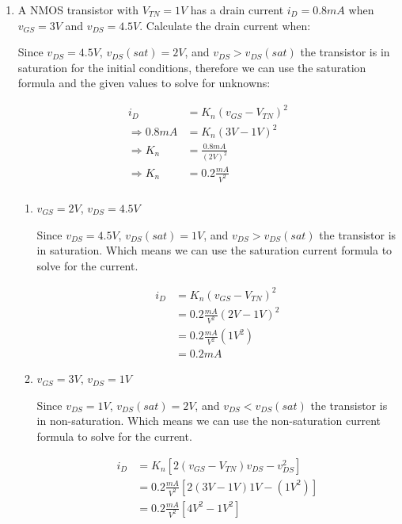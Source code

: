 \documentclass{article}
\begin{document}
\begin{enumerate}
    \item A NMOS transistor with $V_{TN} = 1V$ has a drain current $i_D = 0.8mA$ when $v_{GS} = 3V$ and $v_{DS} = 4.5V$. Calculate the drain current when:
    \begin{center}
        Since $v_{DS} = 4.5V$, $v_{DS}(sat) = 2V$, and $v_{DS} > v_{DS}(sat)$ the transistor is in saturation for the initial conditions, therefore we can use the saturation formula and the given values to solve for unknowns:
    \end{center}
    \begin{align}
        i_D &= K_n(v_{GS} - V_{TN})^2\\
        \Rightarrow 0.8mA &= K_n(3V - 1V)^2\\
        \Rightarrow K_n &= \frac{0.8mA}{(2V)^2}\\
        \Rightarrow K_n &= 0.2\frac{mA}{V^2}\\
    \end{align}
    \begin{enumerate}
        \item $v_{GS} = 2V$, $v_{DS} = 4.5V$
        \begin{center}
            Since $v_{DS} = 4.5V$, $v_{DS}(sat) = 1V$, and $v_{DS} > v_{DS}(sat)$ the transistor is in saturation. Which means we can use the saturation current formula to solve for the current.
        \end{center}
        \begin{align}
            i_D &= K_n(v_{GS} - V_{TN})^2\\
            &= 0.2\frac{mA}{V^2}(2V - 1V)^2\\
            &= 0.2\frac{mA}{V^2}(1V^2)\\
            &= \boxed{0.2mA}
        \end{align}
        \item $v_{GS} = 3V$, $v_{DS} = 1V$
        \begin{center}
            Since $v_{DS} = 1V$, $v_{DS}(sat) = 2V$, and $v_{DS} < v_{DS}(sat)$ the transistor is in non-saturation. Which means we can use the non-saturation current formula to solve for the current.
        \end{center}
         \begin{align}
            i_D &= K_n[2(v_{GS} - V_{TN})v_{DS} - v^2_{DS}]\\
            &= 0.2\frac{mA}{V^2}[2(3V - 1V)1V - (1V^2)]\\
            &= 0.2\frac{mA}{V^2}[4V^2 - 1V^2]\\

\end{align}
\end{enumerate}
\end{enumerate}
\end{document}
